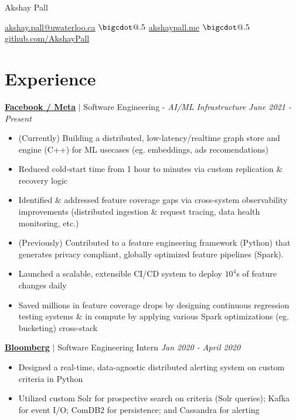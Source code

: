 \documentclass[paper=a4,fontsize=15pt]{scrartcl}
\makeatletter
\newcommand*\bigcdot{\mathpalette\bigcdot@{.5}}
\newcommand*\bigcdot@[2]{\mathbin{\vcenter{\hbox{\scalebox{#2}{$\m@th#1\bullet$}}}}}
\newcommand{\smolboispace}{\vspace*{0.1em}}
\newcommand{\bighalfspace}{\vspace*{0.75em}}
\newcommand{\http}[1]{\href{http://#1}{\ul{#1}}}
\newcommand{\https}[1]{\href{https://#1}{\ul{#1}}}
\newcommand{\email}[1]{\href{mailto:#1}{\ul{#1}}}
\makeatother
\begin{document}
\begin{center}
  {\fontsize{35}{40}\selectfont Akshay Pall \par}

  \smolboispace
  \smolboispace

  {\normalsize
    \email{akshay.pall@uwaterloo.ca}
    $\bigcdot$ \http{akshaypall.me}
    $\bigcdot$ \https{github.com/AkshayPall}
    \par}
\end{center}

 \section*{Experience}{}
\normalsize
\noindent \href{https://facebook.com}{\textbf{\ul{Facebook / Meta}}}
$\vert$ \small Software Engineering - \textit{AI/ML Infrastructure}
{\hfill \footnotesize \textit{June 2021 - Present}}
\begin{itemize}[noitemsep,leftmargin=20pt,label=\raisebox{0.25ex}{\tiny$\bullet$},topsep=5pt]
    \small
    \item (Currently) Building a distributed, low-latency/realtime graph store and engine (C++) for ML usecases (eg. embeddings, ads recomendations)
    \item Reduced cold-start time from 1 hour to minutes via custom replication \& recovery logic
    \item Identified \& addressed feature coverage gaps via cross-system observability improvements (distributed ingestion \& request tracing, data health monitoring, etc.)
    
    \item (Previously) Contributed to a feature engineering framework (Python) that generates privacy compliant, globally optimized feature pipelines (Spark). 
    \item Launched a scalable, extensible  CI/CD system to deploy $10^{4}$s of feature changes daily
    \item Saved millions in feature coverage drops by designing continuous regression testing systems \& in compute by applying various Spark optimizations (eg. bucketing) cross-stack
    
\end{itemize}

\bighalfspace
\normalsize
\noindent \href{https://bloomberg.com}{\textbf{\ul{Bloomberg}}}
$\vert$ \small Software Engineering Intern
{\hfill \footnotesize \textit{Jan 2020 - April 2020}}
\begin{itemize}[noitemsep,leftmargin=20pt,label=\raisebox{0.25ex}{\tiny$\bullet$},topsep=5pt]
  \small
 
  \item Designed a real-time, data-agnostic distributed alerting system on custom criteria in Python
    
  \item Utilized custom Solr for prospective search on criteria (Solr queries); Kafka for event I/O; ComDB2 for persistence; and Cassandra for alerting
  
\end{itemize}
\end{document}
